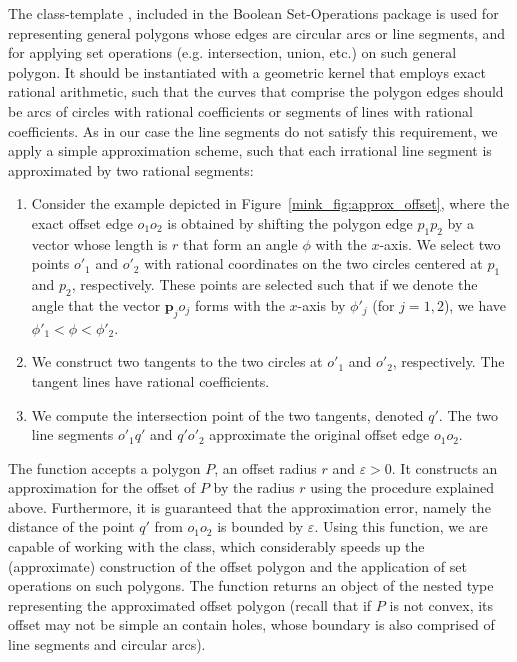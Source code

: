 The class-template , included in
the Boolean Set-Operations package is used for representing general polygons
whose edges are circular arcs or line segments, and for applying set operations
(e.g. intersection, union, etc.) on such general polygon. It should be
instantiated with a geometric kernel that employs exact rational arithmetic,
such that the curves that comprise the polygon edges should be arcs of
circles with rational coefficients or segments of lines with rational
coefficients. As in our case the line segments do not satisfy this requirement,
we apply a simple approximation scheme, such that each irrational line
segment is approximated by two rational segments:
\begin{enumerate}
\item
Consider the example depicted in Figure~\ref{mink_fig:approx_offset}, where
the exact offset edge $o_1 o_2$ is obtained by shifting the polygon edge
$p_1 p_2$ by a vector whose length is $r$ that form an angle $\phi$ with the
$x$-axis. We select two points $o'_1$ and $o'_2$ with rational coordinates
on the two circles centered at $p_1$ and $p_2$, respectively. These points
are selected such that if we denote the angle that the vector 
${\mathbf p_j o_j}$
forms with the $x$-axis by $\phi'_j$ (for $j = 1, 2$), we have
$\phi'_1 < \phi < \phi'_2$.
%
\item
We construct two tangents to the two circles at $o'_1$ and $o'_2$,
respectively. The tangent lines have rational coefficients.
%
\item
We compute the intersection point of the two tangents, denoted $q'$.
The two line segments $o'_1 q'$ and $q' o'_2$ approximate the original
offset edge $o_1 o_2$.
\end{enumerate}

The function  accepts a polygon
$P$, an offset radius $r$ and $\varepsilon > 0$. It constructs an
approximation for the offset of $P$ by the radius $r$ using the procedure
explained above. Furthermore, it is guaranteed that the approximation error,
namely the distance of the point $q'$ from $o_1 o_2$ is bounded by
$\varepsilon$. Using this function, we are capable of working with the
 class, which considerably
speeds up the (approximate) construction of the offset polygon and the
application of set operations on such polygons. The function returns an
object of the nested type
 representing
the approximated offset polygon (recall that if $P$ is not convex, its
offset may not be simple an contain holes, whose boundary is also comprised
of line segments and circular arcs).

